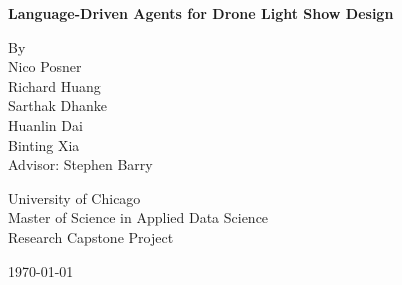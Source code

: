 \begin{titlepage}
\centering
\vspace*{2in}

{\fontsize{18}{22}\bfseries\selectfont
Language-Driven Agents for Drone Light Show Design\par}

\vspace{1in}

{\fontsize{12}{14}\selectfont
By\\
Nico Posner\\
Richard Huang\\
Sarthak Dhanke\\
Huanlin Dai\\
Binting Xia\\
\vspace{0.5in}
Advisor: Stephen Barry\par}

\vspace{0.5in}

{\fontsize{14}{16}\selectfont
University of Chicago\\
Master of Science in Applied Data Science\\
Research Capstone Project\par}
\vspace{0.5in}

{\fontsize{14}{16}\selectfont\today\par}
\end{titlepage}

